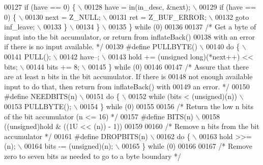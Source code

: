 \begin{DoxyCode}
{{{{00127 \textcolor{preprocessor}{        if (have == 0) \{ \(\backslash\)}
00128 \textcolor{preprocessor}{            have = in(in\_desc, &next); \(\backslash\)}
00129 \textcolor{preprocessor}{            if (have == 0) \{ \(\backslash\)}
00130 \textcolor{preprocessor}{                next = Z\_NULL; \(\backslash\)}
00131 \textcolor{preprocessor}{                ret = Z\_BUF\_ERROR; \(\backslash\)}
00132 \textcolor{preprocessor}{                goto inf\_leave; \(\backslash\)}
00133 \textcolor{preprocessor}{            \} \(\backslash\)}
00134 \textcolor{preprocessor}{        \} \(\backslash\)}
00135 \textcolor{preprocessor}{    \} while (0)}
00136 
00137 \textcolor{comment}{/* Get a byte of input into the bit accumulator, or return from inflateBack()}
00138 \textcolor{comment}{   with an error if there is no input available. */}
00139 \textcolor{preprocessor}{#define PULLBYTE() \(\backslash\)}
00140 \textcolor{preprocessor}{    do \{ \(\backslash\)}
00141 \textcolor{preprocessor}{        PULL(); \(\backslash\)}
00142 \textcolor{preprocessor}{        have--; \(\backslash\)}
00143 \textcolor{preprocessor}{        hold += (unsigned long)(*next++) << bits; \(\backslash\)}
00144 \textcolor{preprocessor}{        bits += 8; \(\backslash\)}
00145 \textcolor{preprocessor}{    \} while (0)}
00146 
00147 \textcolor{comment}{/* Assure that there are at least n bits in the bit accumulator.  If there is}
00148 \textcolor{comment}{   not enough available input to do that, then return from inflateBack() with}
00149 \textcolor{comment}{   an error. */}
00150 \textcolor{preprocessor}{#define NEEDBITS(n) \(\backslash\)}
00151 \textcolor{preprocessor}{    do \{ \(\backslash\)}
00152 \textcolor{preprocessor}{        while (bits < (unsigned)(n)) \(\backslash\)}
00153 \textcolor{preprocessor}{            PULLBYTE(); \(\backslash\)}
00154 \textcolor{preprocessor}{    \} while (0)}
00155 
00156 \textcolor{comment}{/* Return the low n bits of the bit accumulator (n <= 16) */}
00157 \textcolor{preprocessor}{#define BITS(n) \(\backslash\)}
00158 \textcolor{preprocessor}{    ((unsigned)hold & ((1U << (n)) - 1))}
00159 
00160 \textcolor{comment}{/* Remove n bits from the bit accumulator */}
00161 \textcolor{preprocessor}{#define DROPBITS(n) \(\backslash\)}
00162 \textcolor{preprocessor}{    do \{ \(\backslash\)}
00163 \textcolor{preprocessor}{        hold >>= (n); \(\backslash\)}
00164 \textcolor{preprocessor}{        bits -= (unsigned)(n); \(\backslash\)}
00165 \textcolor{preprocessor}{    \} while (0)}
00166 
00167 \textcolor{comment}{/* Remove zero to seven bits as needed to go to a byte boundary */}
}}}}
\end{DoxyCode}
